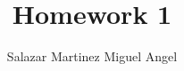 \documentclass[]{report}
\title{Homework 1}
\author{Salazar Martinez Miguel Angel}
\begin{document}
\maketitle

\begin{abstract}
\end{abstract}
\end{document}
